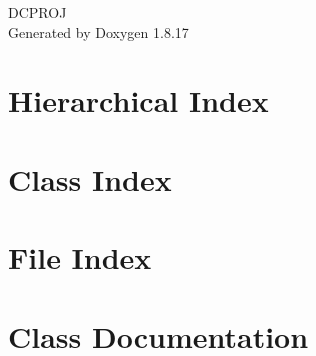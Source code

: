 \let\mypdfximage\pdfximage\def\pdfximage{\immediate\mypdfximage}\documentclass[twoside]{book}
\newcommand{\+}{\discretionary{\mbox{\scriptsize$\hookleftarrow$}}{}{}}
\newcommand{\clearemptydoublepage}{%
  \newpage{\pagestyle{empty}\cleardoublepage}%
}
\begin{document}
\hypersetup{pageanchor=false,
             bookmarksnumbered=true,
             pdfencoding=unicode
            }
\begin{titlepage}
\vspace*{7cm}
\begin{center}%
{\Large D\+C\+P\+R\+OJ }\\
\vspace*{1cm}
{\large Generated by Doxygen 1.8.17}\\
\end{center}
\end{titlepage}
\clearemptydoublepage
{}
\tableofcontents
\clearemptydoublepage
{}
\hypersetup{pageanchor=true}

\chapter{Hierarchical Index}

\chapter{Class Index}

\chapter{File Index}

\chapter{Class Documentation}











































\end{document}
